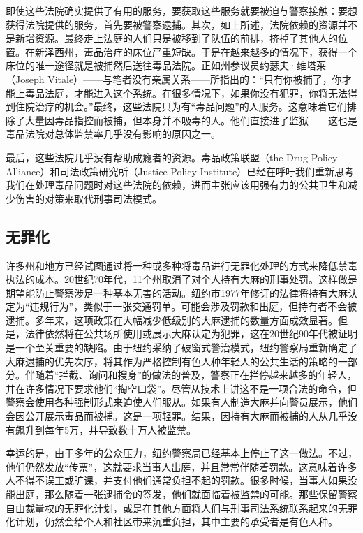 \documentclass[fontset=fandol, a4paper, 12pt, openright]{ctexbook}
\begin{document}
即使这些法院确实提供了有用的服务，要获取这些服务就要被迫与警察接触：要想获得法院提供的服务，首先要被警察逮捕。其次，如上所述，法院依赖的资源并不是新增资源。最终走上法庭的人们只是被移到了队伍的前排，挤掉了其他人的位置。在新泽西州，毒品治疗的床位严重短缺。于是在越来越多的情况下，获得一个床位的唯一途径就是被捕然后送往毒品法院。正如州参议员约瑟夫·维塔莱（Joseph Vitale）——与笔者没有亲属关系——所指出的：“只有你被捕了，你才能上毒品法庭，才能进入这个系统。在很多情况下，如果你没有犯罪，你将无法得到住院治疗的机会。”最终，这些法院只为有“毒品问题”的人服务。这意味着它们排除了大量因毒品指控而被捕，但本身并不吸毒的人。他们直接进了监狱——这也是毒品法院对总体监禁率几乎没有影响的原因之一。

最后，这些法院几乎没有帮助成瘾者的资源。毒品政策联盟（the Drug Policy Alliance）和司法政策研究所（Justice Policy Institute）已经在呼吁我们重新思考我们在处理毒品问题时对这些法院的依赖，进而主张应该用强有力的公共卫生和减少伤害的对策来取代刑事司法模式。

\subsection{无罪化}
许多州和地方已经试图通过将一种或多种将毒品进行无罪化处理的方式来降低禁毒执法的成本。20世纪70年代，11个州取消了对个人持有大麻的刑事处罚。这样做是期望能防止警察涉足一种基本无害的活动。纽约市1977年修订的法律将持有大麻认定为“违规行为”，类似于一张交通罚单。可能会涉及罚款和出庭，但持有者不会被逮捕。多年来，这项政策在大幅减少低级别的大麻逮捕的数量方面成效显著。但是，法律依然将在公共场所使用或展示大麻认定为犯罪，这在20世纪90年代被证明是一个至关重要的缺陷。由于纽约采纳了破窗式警治模式，纽约警察局重新确定了大麻逮捕的优先次序，将其作为严格控制有色人种年轻人的公共生活的策略的一部分。伴随着“拦截、询问和搜身”的做法的普及，警察正在拦停越来越多的年轻人，并在许多情况下要求他们“掏空口袋”。尽管从技术上讲这不是一项合法的命令，但警察会使用各种强制形式来迫使人们服从。如果有人制造大麻并向警员展示，他们会因公开展示毒品而被捕。这是一项轻罪。结果，因持有大麻而被捕的人从几乎没有飙升到每年5万，并导致数十万人被监禁。

幸运的是，由于多年的公众压力，纽约警察局已经基本上停止了这一做法。不过，他们仍然发放“传票”，这就要求当事人出庭，并且常常伴随着罚款。这意味着许多人不得不误工或旷课，并支付他们通常负担不起的罚款。很多时候，当事人如果没能出庭，那么随着一张逮捕令的签发，他们就面临着被监禁的可能。那些保留警察自由裁量权的无罪化计划，或是在其他方面将人们与刑事司法系统联系起来的无罪化计划，仍然会给个人和社区带来沉重负担，其中主要的承受者是有色人种。
\end{document}

